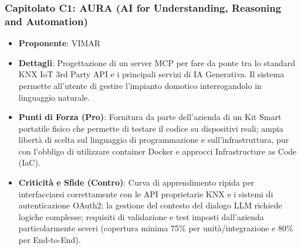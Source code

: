 \subsubsection{Capitolato C1: AURA (AI for Understanding, Reasoning and Automation)}
\begin{itemize}
    \item \textbf{Proponente}: VIMAR
    \item \textbf{Dettagli}: Progettazione di un server MCP per fare da ponte tra lo standard KNX IoT 3rd Party API e i principali servizi di IA Generativa. Il sistema permette all'utente di gestire l'impianto domotico interrogandolo in linguaggio naturale.

    \item \textbf{Punti di Forza (Pro)}: Fornitura da parte dell'azienda di un Kit Smart portatile fisico che permette di testare il codice su dispositivi reali; ampia libertà di scelta sul linguaggio di programmazione e sull'infrastruttura, pur con l'obbligo di utilizzare container Docker e approcci Infrastructure as Code (IaC).

    \item \textbf{Criticità e Sfide (Contro)}: Curva di apprendimento ripida per interfacciarsi correttamente con le API proprietarie KNX e i sistemi di autenticazione OAuth2; la gestione del contesto del dialogo LLM richiede logiche complesse; requisiti di validazione e test imposti dall'azienda particolarmente severi (copertura minima 75\% per unità/integrazione e 80\% per End-to-End).

\end{itemize}


